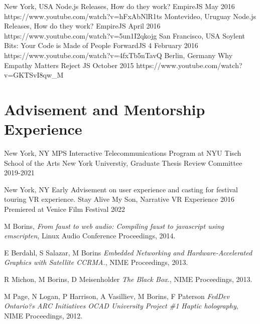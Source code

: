 \documentclass[11pt,a4paper,sans]{moderncv}   %
\begin{document}
\cventry
  {New York, USA}
  {Node.js Releases, How do they work?}
  {EmpireJS}
  {May 2016}{}
  {https://www.youtube.com/watch?v=hFxAbNlR1ts}
\cventry
  {Montevideo, Uruguay}
  {Node.js Releases, How do they work?}
  {EmpireJS}
  {April 2016}{}
  {https://www.youtube.com/watch?v=5un1I2qkojg}
\cventry
  {San Francisco, USA}
  {Soylent Bits: Your Code is Made of People}
  {ForwardJS 4}
  {February 2016}{}
  {https://www.youtube.com/watch?v=4fxTb5nTavQ}
\cventry
  {Berlin, Germany}
  {Why Empathy Matters}
  {Reject JS}
  {October 2015}{}
  {https://www.youtube.com/watch?v=GKTSvI8qw\_M}

\section{Advisement and Mentorship Experience}
\cventry
  {New York, NY}
  {MPS Interactive Telecommunications Program at NYU Tisch School of the Arts}
  {New York Universtiy, Graduate Thesis Review Committee}
  {2019-2021}{}
  {}

\cventry
  {New York, NY}
  {Early Advisement on user experience and casting for festival touring VR experience.}
  {Stay Alive My Son, Narrative VR Experience}
  {2016}{}
  {Premiered at Venice Film Festival 2022}



\begin{thebibliography}{9}

  M Borins,
  \textit{From faust to web audio: Compiling faust to javascript using emscripten},
  Linux Audio Conference Proceedings,
  2014.

  E Berdahl, S Salazar, M Borins
  \textit{Embedded Networking and Hardware-Accelerated Graphics with Satellite CCRMA.},
  NIME Proceedings,
  2013.

  R Michon, M Borins, D Meisenholder
  \textit{The Black Box.},
  NIME Proceedings,
  2013.

  M Page, N Logan, P Harrison, A Vasilliev, M Borins, F Paterson
  \textit{FedDev Ontario?s ARC Initiatives OCAD University Project \#1 Haptic holography},
  NIME Proceedings,
  2012.

\end{thebibliography}
\end{document}
